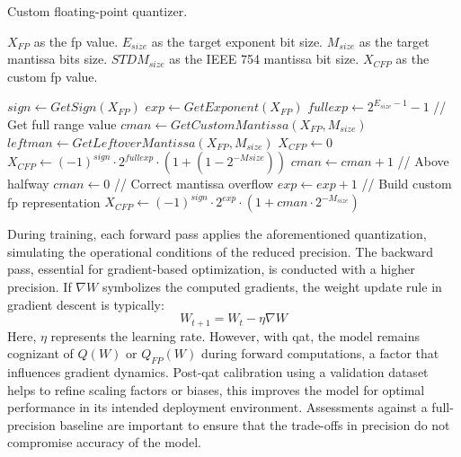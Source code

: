 \begin{algorithm}[h!]
	\caption{Custom floating-point quantizer.}
	\label{alg:quantizr}
	\begin{algorithmic}
		\SetAlgoLined
		\renewcommand{\algorithmicrequire}{\textbf{input:}}
		\renewcommand{\algorithmicensure}{\textbf{output:}}
		\REQUIRE $X_{FP}$ as the \gls{fp} value.
		\REQUIRE $E_{size}$ as the target exponent bit size.
		\REQUIRE $M_{size}$ as the target mantissa bits size.
		\REQUIRE $STDM_{size}$ as the IEEE 754 mantissa bit size.
		\ENSURE $X_{CFP}$ as the custom \gls{fp} value.
		
		\STATE $sign \gets GetSign(X_{FP})$
		\STATE $exp \gets GetExponent(X_{FP})$
		\STATE $fullexp \gets 2^{E_{size}-1}-1$ // Get full range value
		\STATE $cman \gets GetCustomMantissa(X_{FP}, M_{size})$
		\STATE $leftman \gets GetLeftoverMantissa(X_{FP}, M_{size})$
		\STATE$X_{CFP}\gets0$
		\STATE$X_{CFP}\gets (-1)^{sign}\cdot2^{fullexp}\cdot(1+(1-2^{-M{size}}))$
		\ELSE
		\STATE $cman \gets cman+1$ // Above halfway
		\STATE $cman \gets 0$ // Correct mantissa overflow
		\STATE $exp \gets exp + 1$
		\ENDIF
		\ENDIF
		\STATE // Build custom \gls{fp} representation
		\STATE$X_{CFP}\gets (-1)^{sign}\cdot2^{exp}\cdot(1+cman\cdot2^{-M_{size}})$
		\ENDIF
	\end{algorithmic}
\end{algorithm}

During training, each forward pass applies the aforementioned quantization, simulating the operational conditions of the reduced precision. The backward pass, essential for gradient-based optimization, is conducted with a higher precision. If \( \nabla W \) symbolizes the computed gradients, the weight update rule in gradient descent is typically:
\begin{equation}
W_{t+1} = W_t - \eta \nabla W
\end{equation}
Here, \( \eta \) represents the learning rate. However, with \gls{qat}, the model remains cognizant of \( Q(W) \) or \( Q_{FP}(W) \) during forward computations, a factor that influences gradient dynamics. Post-\gls{qat} calibration using a validation dataset helps to refine scaling factors or biases, this improves the model for optimal performance in its intended deployment environment. Assessments against a full-precision baseline are important to ensure that the trade-offs in precision do not compromise accuracy of the model.

